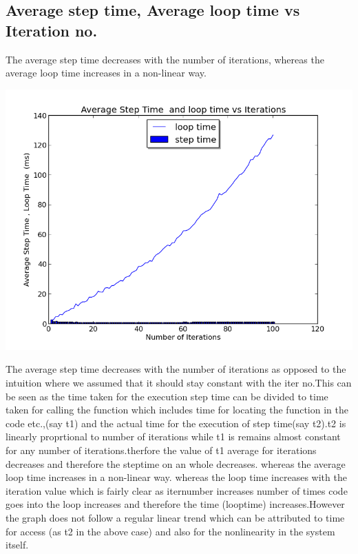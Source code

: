 \documentclass[11pt]{article}
\begin{document}
\subsection{Average step time, Average loop time vs Iteration no.}
The average step time decreases with the number of iterations, whereas the average loop time increases in a non-linear way.
\begin{center}\includegraphics[scale=0.7]{../details/images/g31_plot01.png}
\end{center}
The average step time decreases with the number of iterations as opposed to the intuition where we assumed that it should stay constant with the iter no.This can be seen as the time taken for the execution step time can be divided to time taken for calling the function which includes time for locating the function in the code etc.,(say t1) and the actual time for the execution of step time(say t2).t2 is linearly proprtional to number of iterations while t1 is remains almost constant for any number of iterations.therfore the value of t1 average for iterations decreases and therefore the steptime on an whole decreases. whereas the average loop time increases in a non-linear way.\newline
whereas the loop time increases with the iteration value which is fairly clear as iternumber increases number of times code goes into the loop increases and therefore the time (looptime) increases.However the graph does not follow a regular linear trend which can be attributed to time for access (as t2 in the above case) and also for the nonlinearity in the system itself.
\end{document}
